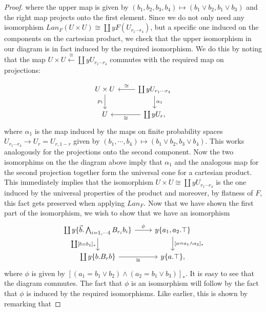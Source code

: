 \documentclass[a4paper]{amsproc}
\theoremstyle{plain}
\theoremstyle{definition}
\theoremstyle{remark}
\numberwithin{equation}{section}
\begin{document}
\begin{proof}
where the upper map is given by $(b_1,b_2,b_3,b_4) \mapsto (b_1 \vee b_2, b_1 \vee b_3)$ and the right map projects onto the first element. Since we do not only need any isomorphism $Lan_F (U \times U) \cong \coprod y F (U_{r_1 \cdots r_4})$, but a specific one induced on the components on the cartesian product, we check that the upper isomorphism in our diagram is in fact induced by the required isomorphism. We do this by noting that the map $U \times U \xleftarrow{\cong} \coprod y U_{r_1 \cdots r_4}$ commutes with the required map on projections:

\[
\begin{tikzcd}
U \times U \arrow[d, "p_1"'] & \coprod y U_{r_1 \cdots r_4} \arrow[d, "\alpha_1"] \arrow[l, "\cong"'] \\
U                            & \coprod y U_r \arrow[l, "\cong"]                                    ,
\end{tikzcd}
\]
where $\alpha_1$ is the map induced by the maps on finite probability spaces $U_{r_1 \cdots r_4} \to U_r = U_{r,1-r}$ given by $(b_1,\cdots,b_4) \mapsto (b_1 \vee b_2, b_3 \vee b_4)$. This works analogously for the projections onto the second component. Now the two isomorphims on the the diagram above imply that $\alpha_1$ and the analogous map for the second projection together form the universal cone for a cartesian product. This immediately implies that the isomorphism $U \times U \cong \coprod y U_{r_1 \cdots r_4}$ is the one induced by the universal properties of the product and moreover, by flatness of $F$, this fact gets preserved when applying $Lan_F$. Now that we have shown the first part of the isomorphism, we wish to show that we have an isomorphism
\[
\begin{tikzcd}
{\coprod y \{\vec{b}.\bigwedge_{i=1,\cdots 4} B_{r_i} b_i\}} \arrow[d, "{\coprod [b = b_1]_*}"'] \arrow[r, "\phi"] & {y \{a_1,a_2.\top\}} \arrow[d, "{[a = a_1 \wedge a_2]_*}"] \\
\coprod y \{b.B_rb\} \arrow[r, "\cong"']                                                & y\{a.\top\}                                               ,
\end{tikzcd}
\]
where $\phi$ is given by $[(a_1 = b_1 \vee b_2) \wedge (a_2 = b_1 \vee b_3)]_*$. It is easy to see that the diagram commutes. The fact that $\phi$ is an isomorphism will follow by the fact that $\phi$ is induced by the required isomorphisms. Like earlier, this is shown by remarking that


\end{proof}
\end{document}
